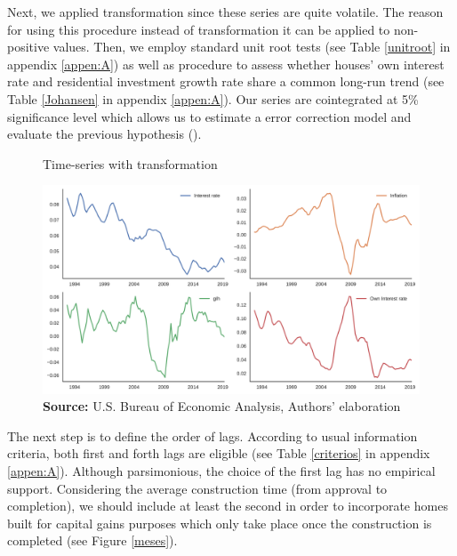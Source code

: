 Next, we applied \textcite{yeo_new_2000} transformation since these series are quite volatile. The reason for using this procedure instead of \textcite{box_analysis_1964} transformation  it can be applied to non-positive values. 
Then, we employ standard unit root tests (see Table \ref{unitroot} in appendix \ref{appen:A}) as well as \textcite{johansen_estimation_1991} procedure to assess whether houses' own interest rate and residential investment growth rate share a common long-run trend (see Table \ref{Johansen} in appendix \ref{appen:A}).
Our series are cointegrated at 5\% significance level which allows us to estimate a error correction model and evaluate the previous hypothesis (\cite{enders_applied_2014}).

\begin{figure}[htb]
	\centering
	\caption{Time-series with \textcite{yeo_new_2000} transformation}
	\label{YeoJhonson}
	\includegraphics[width=\textwidth]{./figs/YeoJohnson_All}
	\caption*{\textbf{Source:} U.S. Bureau of Economic Analysis, Authors' elaboration}
\end{figure}


The next step is to define the order of lags. According to usual information criteria, both first and forth lags are eligible (see Table \ref{criterios} in appendix \ref{appen:A}).
Although parsimonious, the choice of the first lag has no empirical support.
Considering the average construction time (from approval to completion), we should include at least the second in order to incorporate homes built for capital gains purposes which only take place once the construction is completed (see Figure \ref{meses}).


